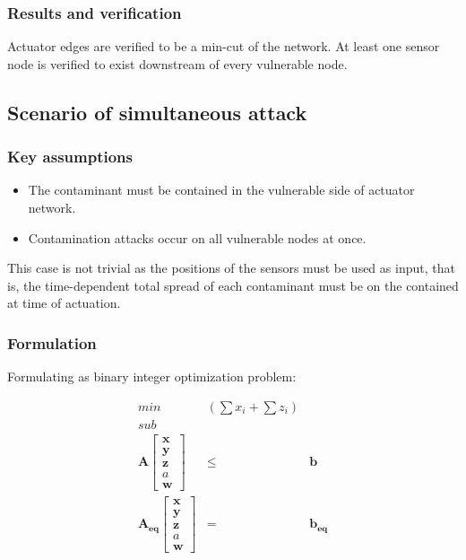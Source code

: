 \documentclass[authoryear,preprint,review,12pt]{elsarticle}
\begin{document}
\subsubsection{Results and verification}
Actuator edges are verified to be a min-cut of the network. At least one sensor node is verified to exist downstream of every vulnerable node.



\subsection{Scenario of simultaneous attack \label{sub:Scenario-2:containment}}
\subsubsection{Key assumptions}
\begin{itemize}
    \item  The contaminant must be contained in the vulnerable side
    of actuator network.
    \item Contamination attacks occur on all vulnerable nodes at once.
\end{itemize}
This case is not trivial as the positions of the sensors must be used
as input, that is, the time-dependent total spread of each contaminant
must be on the contained at time of actuation.


\subsubsection{Formulation}

Formulating as binary integer optimization problem:

\begin{eqnarray*}
min & (\sum x_{i}+\sum z_{i})\\
sub\\
\mathbf{A}\left[\begin{array}{c}
\mathbf{x}\\
\mathbf{y}\\
\mathbf{z}\\
a\\
\mathbf{w}
\end{array}\right] & \leq & \mathbf{b}\\
\mathbf{A_{eq}}\left[\begin{array}{c}
\mathbf{x}\\
\mathbf{y}\\
\mathbf{z}\\
a\\
\mathbf{w}
\end{array}\right] & = & \mathbf{b_{eq}}
\end{eqnarray*}
\end{document}
